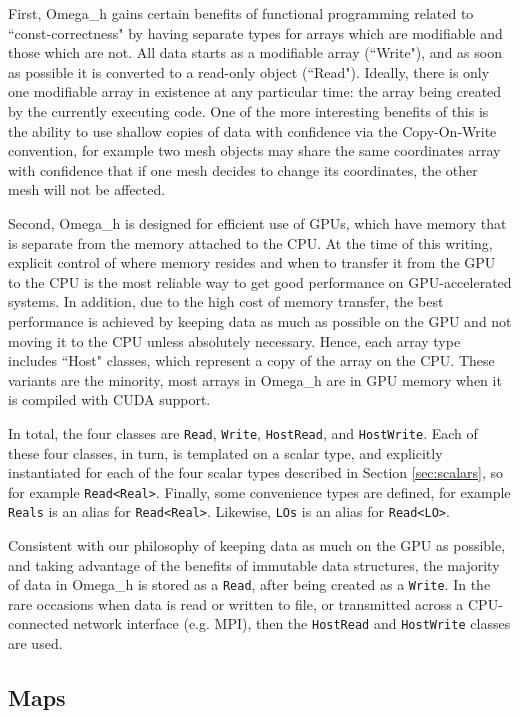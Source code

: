 \documentclass{article}
\begin{document}
First, Omega\_h gains certain benefits of functional programming
related to ``const-correctness" by having separate types
for arrays which are modifiable and those which are not.
All data starts as a modifiable array (``Write"), and as soon as possible
it is converted to a read-only object (``Read").
Ideally, there is only one modifiable array in existence at any
particular time: the array being created by the currently
executing code.
One of the more interesting benefits of this is the ability
to use shallow copies of data with confidence via the
Copy-On-Write convention, for example two mesh objects
may share the same coordinates array with confidence
that if one mesh decides to change its coordinates,
the other mesh will not be affected.

Second, Omega\_h is designed for efficient use of
GPUs, which have memory that is separate from
the memory attached to the CPU.
At the time of this writing, explicit control of where
memory resides and when to transfer it from the GPU
to the CPU is the most reliable way to get good
performance on GPU-accelerated systems.
In addition, due to the high cost of memory transfer,
the best performance is achieved by keeping data as
much as possible on the GPU and not moving it to the
CPU unless absolutely necessary.
Hence, each array type includes ``Host" classes,
which represent a copy of the array on the CPU.
These variants are the minority, most arrays in Omega\_h
are in GPU memory when it is compiled with CUDA support.

In total, the four classes are \texttt{Read}, \texttt{Write},
\texttt{HostRead}, and \texttt{HostWrite}.
Each of these four classes, in turn, is templated on
a scalar type, and explicitly instantiated for
each of the four scalar types described in Section
\ref{sec:scalars}, so for example \texttt{Read<Real>}.
Finally, some convenience types are defined, for example
\texttt{Reals} is an alias for \texttt{Read<Real>}.
Likewise, \texttt{LOs} is an alias for \texttt{Read<LO>}.

Consistent with our philosophy of keeping data as much
on the GPU as possible, and taking advantage of the
benefits of immutable data structures, the majority
of data in Omega\_h is stored as a \texttt{Read},
after being created as a \texttt{Write}.
In the rare occasions when data is read or written
to file, or transmitted across a CPU-connected
network interface (e.g. MPI), then the \texttt{HostRead}
and \texttt{HostWrite} classes are used.

\subsection{Maps}
\end{document}

